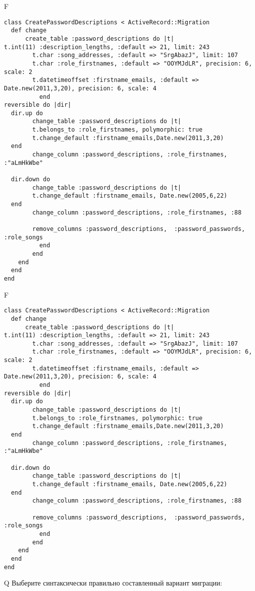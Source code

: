 F
\begin{verbatim}
class CreatePasswordDescriptions < ActiveRecord::Migration
  def change
	  create_table :password_descriptions do |t|
t.int(11) :description_lengths, :default => 21, limit: 243
		t.char :song_addresses, :default => "SrgAbazJ", limit: 107
		t.char :role_firstnames, :default => "OOYMJdLR", precision: 6, scale: 2
		t.datetimeoffset :firstname_emails, :default => Date.new(2011,3,20), precision: 6, scale: 4
		  end
reversible do |dir|
  dir.up do
		change_table :password_descriptions do |t|
		t.belongs_to :role_firstnames, polymorphic: true
 		t.change_default :firstname_emails,Date.new(2011,3,20)
  end
 		change_column :password_descriptions, :role_firstnames, :"aLmHkWbe"
   
  dir.down do
		change_table :password_descriptions do |t|
		t.change_default :firstname_emails, Date.new(2005,6,22)
  end
 		change_column :password_descriptions, :role_firstnames, :88
   
		remove_columns :password_descriptions,  :password_passwords, :role_songs 
	      end
	    end
    end 
  end
end

\end{verbatim}

F
\begin{verbatim}
class CreatePasswordDescriptions < ActiveRecord::Migration
  def change
	  create_table :password_descriptions do |t|
t.int(11) :description_lengths, :default => 21, limit: 243
		t.char :song_addresses, :default => "SrgAbazJ", limit: 107
		t.char :role_firstnames, :default => "OOYMJdLR", precision: 6, scale: 2
		t.datetimeoffset :firstname_emails, :default => Date.new(2011,3,20), precision: 6, scale: 4
		  end
reversible do |dir|
  dir.up do
		change_table :password_descriptions do |t|
		t.belongs_to :role_firstnames, polymorphic: true
 		t.change_default :firstname_emails,Date.new(2011,3,20)
  end
 		change_column :password_descriptions, :role_firstnames, :"aLmHkWbe"
   
  dir.down do
		change_table :password_descriptions do |t|
		t.change_default :firstname_emails, Date.new(2005,6,22)
  end
 		change_column :password_descriptions, :role_firstnames, :88
   
		remove_columns :password_descriptions,  :password_passwords, :role_songs 
	      end
	    end
    end 
  end
end

\end{verbatim}

Q
Выберите синтаксически правильно составленный вариант миграции:

